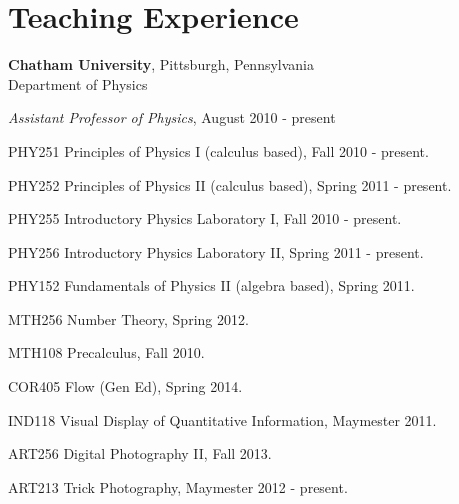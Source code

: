 \section{\sc Teaching Experience} %

{\bf Chatham University}, Pittsburgh, Pennsylvania\\
Department of Physics
\vspace{1mm}
\begin{list1}
\item[] {\em Assistant Professor of Physics}, August 2010 - present
\vspace*{2mm}  
\begin{list2}
\item[\fcscore{4}] PHY251 Principles of Physics I (calculus based),  Fall 2010 - present.
\item[\fcscore{4}] PHY252 Principles of Physics II (calculus based),  Spring 2011 - present.
\item[\fcscore{4}] PHY255 Introductory Physics Laboratory I,  Fall 2010 - present.
\item[\fcscore{4}] PHY256 Introductory Physics Laboratory II,  Spring 2011 - present.
\item[\fcscore{1}] PHY152 Fundamentals of Physics II (algebra based),  Spring 2011.
\item[\fcscore{1}] MTH256 Number Theory, Spring 2012.
\item[\fcscore{1}] MTH108 Precalculus, Fall 2010.
\item[\fcscore{1}] COR405 Flow (Gen Ed), Spring 2014.
\item[\fcscore{1}] IND118 Visual Display of Quantitative Information, Maymester 2011.
\item[\fcscore{1}] ART256 Digital Photography II, Fall 2013.
\item[\fcscore{2}] ART213 Trick Photography, Maymester 2012 - present.
\end{list2}

\end{list1}



